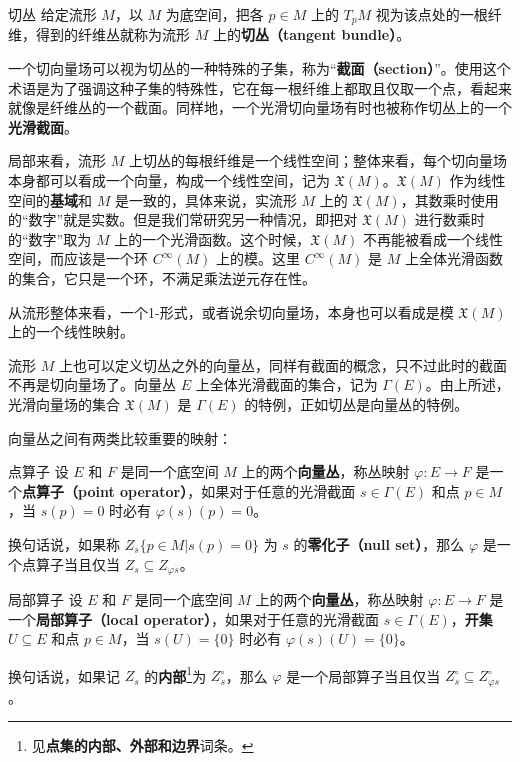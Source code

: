 \begin{definition}{切丛}
给定流形 $M$，以 $M$ 为底空间，把各 $p\in M$ 上的 $T_pM$ 视为该点处的一根纤维，得到的纤维丛就称为流形 $M$ 上的\textbf{切丛（tangent bundle）}。
\end{definition}

一个切向量场可以视为切丛的一种特殊的子集，称为“\textbf{截面（section）}”。使用这个术语是为了强调这种子集的特殊性，它在每一根纤维上都取且仅取一个点，看起来就像是纤维丛的一个截面。同样地，一个光滑切向量场有时也被称作切丛上的一个\textbf{光滑截面}。

局部来看，流形 $M$ 上切丛的每根纤维是一个线性空间；整体来看，每个切向量场本身都可以看成一个向量，构成一个线性空间，记为 $\mathfrak{X}(M)$。$\mathfrak{X}(M)$ 作为线性空间的\textbf{基域}和 $M$ 是一致的，具体来说，实流形 $M$ 上的 $\mathfrak{X}(M)$，其数乘时使用的“数字”就是实数。但是我们常研究另一种情况，即把对 $\mathfrak{X}(M)$ 进行数乘时的“数字”取为 $M$ 上的一个光滑函数。这个时候，$\mathfrak{X}(M)$ 不再能被看成一个线性空间，而应该是一个环 $C^\infty(M)$ 上的模。这里 $C^\infty(M)$ 是 $M$ 上全体光滑函数的集合，它只是一个环，不满足乘法逆元存在性。

从流形整体来看，一个1-形式，或者说余切向量场，本身也可以看成是模 $\mathfrak{X}(M)$ 上的一个线性映射。

流形 $M$ 上也可以定义切丛之外的向量丛，同样有截面的概念，只不过此时的截面不再是切向量场了。向量丛 $E$ 上全体光滑截面的集合，记为 $\Gamma(E)$。由上所述，光滑向量场的集合 $\mathfrak{X}(M)$ 是 $\Gamma(E)$ 的特例，正如切丛是向量丛的特例。

向量丛之间有两类比较重要的映射：

\begin{definition}{点算子}
设 $E$ 和 $F$ 是同一个底空间 $M$ 上的两个\textbf{向量丛}，称丛映射 $\varphi:E\rightarrow F$ 是一个\textbf{点算子（point operator）}，如果对于任意的光滑截面 $s\in\Gamma(E)$ 和点 $p\in M$，当 $s(p)=0$ 时必有 $\varphi(s)(p)=0$。

换句话说，如果称 $Z_s\{p\in M|s(p)=0\}$ 为 $s$ 的\textbf{零化子（null set）}，那么 $\varphi$ 是一个点算子当且仅当 $Z_s\subseteq Z_{\varphi{s}}$。
\end{definition}

\begin{definition}{局部算子}
设 $E$ 和 $F$ 是同一个底空间 $M$ 上的两个\textbf{向量丛}，称丛映射 $\varphi:E\rightarrow F$ 是一个\textbf{局部算子（local operator）}，如果对于任意的光滑截面 $s\in\Gamma(E)$，\textbf{开集}$U\subseteq E$ 和点 $p\in M$，当 $s(U)=\{0\}$ 时必有 $\varphi(s)(U)=\{0\}$。

换句话说，如果记 $Z_s$ 的\textbf{内部}\footnote{见\textbf{点集的内部、外部和边界}词条。}为 $Z_s^\circ$，那么 $\varphi$ 是一个局部算子当且仅当 $Z_s^\circ\subseteq Z_{\varphi{s}}^\circ$。
\end{definition}

